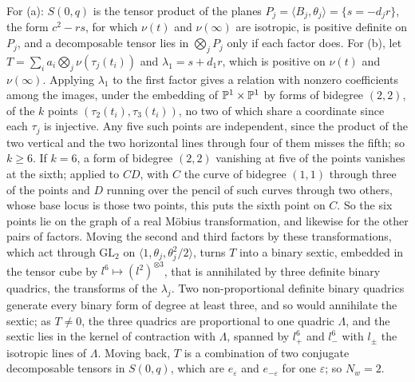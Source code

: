 \begin{remark}
For (a): $S(0,q)$ is the tensor product of the planes
$P_{j}=\langle B_{j},\theta_{j}\rangle=\{s=-d_{j}r\}$, the form $c^{2}-rs$, for
which $\nu(t)$ and $\nu(\infty)$ are isotropic, is positive definite on
$P_{j}$, and a decomposable tensor lies in $\bigotimes_{j}P_{j}$ only if each
factor does. For (b), let $T=\sum_{i}a_{i}\bigotimes_{j}\nu(\tau_{j}(t_{i}))$
and $\lambda_{1}=s+d_{1}r$, which is positive on $\nu(t)$ and $\nu(\infty)$.
Applying $\lambda_{1}$ to the first factor gives a relation with nonzero
coefficients among the images, under the embedding of
$\mathbb{P}^{1}\times\mathbb{P}^{1}$ by forms of bidegree $(2,2)$, of the $k$ points
$(\tau_{2}(t_{i}),\tau_{3}(t_{i}))$, no two of which share a coordinate since
each $\tau_{j}$ is injective. Any five such points are independent, since the
product of the two vertical and the two horizontal lines through four of them
misses the fifth; so $k\ge6$. If $k=6$, a form of bidegree $(2,2)$ vanishing
at five of the points vanishes at the sixth; applied to $CD$, with $C$ the
curve of bidegree $(1,1)$ through three of the points and $D$ running over
the pencil of such curves through two others, whose base locus is those two
points, this puts the sixth point on $C$. So the six points lie on the graph
of a real M\"obius transformation, and likewise for the other pairs of
factors. Moving the second and third factors by these transformations, which
act through $\mathrm{GL}_{2}$ on $\langle1,\theta_{j},\theta_{j}^{2}/2\rangle$,
turns $T$ into a binary sextic, embedded in the tensor cube by
$l^{6}\mapsto(l^{2})^{\otimes3}$, that is annihilated by three definite
binary quadrics, the transforms of the $\lambda_{j}$. Two non-proportional
definite binary quadrics generate every binary form of degree at least three,
and so would annihilate the sextic; as $T\ne0$, the three quadrics are
proportional to one quadric $\Lambda$, and the sextic lies in the kernel of
contraction with $\Lambda$, spanned by $l_{+}^{6}$ and $l_{-}^{6}$ with
$l_{\pm}$ the isotropic lines of $\Lambda$. Moving back, $T$
is a combination of two conjugate decomposable tensors in $S(0,q)$, which are
$e_{\varepsilon}$ and $e_{-\varepsilon}$ for one $\varepsilon$; so
$N_{w}=2$.
\end{remark}
